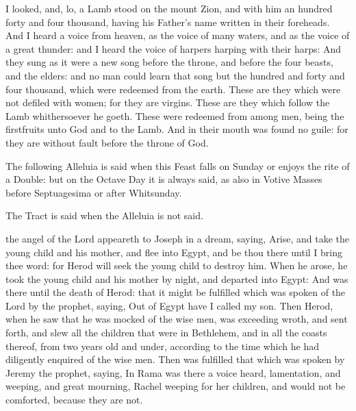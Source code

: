 I looked, and, lo, a Lamb stood on the mount Zion, and with him an hundred forty and four thousand, having his Father's name written in their foreheads. And I heard a voice from heaven, as the voice of many waters, and as the voice of a great thunder: and I heard the voice of harpers harping with their harps: And they sung as it were a new song before the throne, and before the four beasts, and the elders: and no man could learn that song but the hundred and forty and four thousand, which were redeemed from the earth. These are they which were not defiled with women; for they are virgins. These are they which follow the Lamb whithersoever he goeth. These were redeemed from among men, being the firstfruits unto God and to the Lamb. And in their mouth was found no guile: for they are without fault before the throne of God.

\begin{rubric}
    The following Alleluia is said when this Feast falls on Sunday or enjoys the rite of a  Double: but on the Octave Day it is always said, as also in Votive Masses before Septuagesima or after Whitsunday.
\end{rubric}
\begin{rubric}
     The Tract is said when the Alleluia is not said.
\end{rubric}

 the angel of the Lord appeareth to Joseph in a dream, saying, Arise, and take the young child and his mother, and flee into Egypt, and be thou there until I bring thee word: for Herod will seek the young child to destroy him. When he arose, he took the young child and his mother by night, and departed into Egypt: And was there until the death of Herod: that it might be fulfilled which was spoken of the Lord by the prophet, saying, Out of Egypt have I called my son. Then Herod, when he saw that he was mocked of the wise men, was exceeding wroth, and sent forth, and slew all the children that were in Bethlehem, and in all the coasts thereof, from two years old and under, according to the time which he had diligently enquired of the wise men. Then was fulfilled that which was spoken by Jeremy the prophet, saying, In Rama was there a voice heard, lamentation, and weeping, and great mourning, Rachel weeping for her children, and would not be comforted, because they are not.

